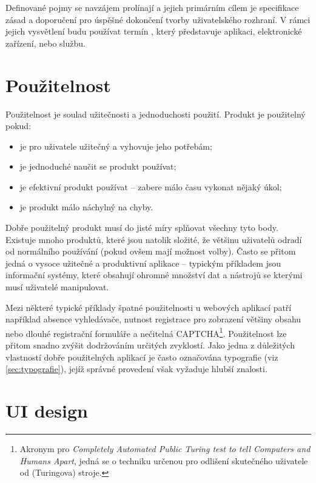 Definované pojmy se navzájem prolínají a jejich primárním cílem je specifikace zásad a doporučení pro úspěšné dokončení tvorby uživatelského rozhraní. V rámci jejich vysvětlení budu používat termín , který představuje aplikaci, elektronické zařízení, nebo službu.

\section{Použitelnost}
\label{sec:usability}

Použitelnost je soulad užitečnosti a jednoduchosti použití. Produkt je použitelný pokud:

\begin{itemize}
    \item je pro uživatele užitečný a vyhovuje jeho potřebám;
    \item je jednoduché naučit se produkt používat;
    \item je efektivní produkt používat -- zabere málo času vykonat nějaký úkol;
    \item je produkt málo náchylný na chyby.
\end{itemize}

Dobře použitelný produkt musí do jisté míry splňovat všechny tyto body. Existuje mnoho produktů, které jsou natolik složité, že většinu uživatelů odradí od normálního používání (pokud ovšem mají možnost volby). Často se přitom jedná o vysoce užitečné a produktivní aplikace -- typickým příkladem jsou informační systémy, které obsahují ohromné množství dat a nástrojů se kterými musí uživatelé manipulovat.

Mezi některé typické příklady špatné použitelnosti u webových aplikací patří například absence vyhledávače, nutnost registrace pro zobrazení většiny obsahu nebo dlouhé registrační formuláře a nečitelná CAPTCHA\footnote{Akronym pro \textit{Completely Automated Public Turing test to tell Computers and Humans Apart}, jedná se o techniku určenou pro odlišení skutečného uživatele od (Turingova) stroje.}. Použitelnost lze přitom snadno zvýšit dodržováním určitých zvyklostí. Jako jedna z důležitých vlastností dobře použitelných aplikací je často označována typografie (viz \ref{sec:typografie}), jejíž správné provedení však vyžaduje hlubší znalosti.

\section{UI design}
\label{sec:uidesign}


